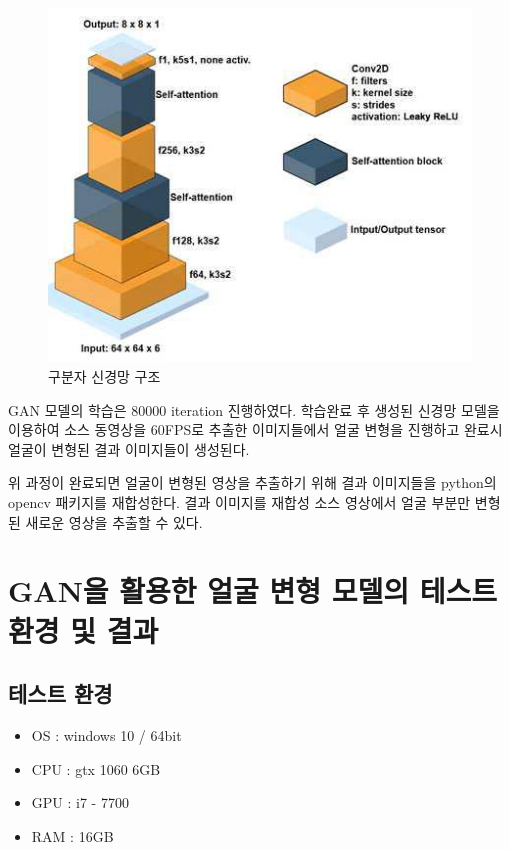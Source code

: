 \documentclass[chapter,oneside]{oblivoir}
\newcommand{\spec}{
    \begin{itemize}
        \item OS : windows 10 / 64bit
        \item CPU : gtx 1060 6GB
        \item GPU : i7 - 7700
        \item RAM : 16GB
    \end{itemize}
    }
\begin{document}
\begin{enumerate}
    \begin{figure}[h!]
    \centering
    \includegraphics{pic/chp5/img906}
    \caption{구분자 신경망 구조\cite{reference11}}
    \end{figure}

    GAN 모델의 학습은 80000 iteration 진행하였다. 학습완료 후 생성된 신경망 모델을 이용하여 소스 동영상을 60FPS로 추출한 이미지들에서 얼굴 변형을 진행하고 완료시 얼굴이 변형된 결과 이미지들이 생성된다.

    위 과정이 완료되면 얼굴이 변형된 영상을 추출하기 위해 결과 이미지들을 python의 opencv 패키지를 재합성한다. 결과 이미지를 재합성 소스 영상에서 얼굴 부분만 변형된 새로운 영상을 추출할 수 있다.
\end{enumerate}

    \section{ GAN을 활용한 얼굴 변형 모델의 테스트 환경 및 결과}

    \subsection{테스트 환경}
    \spec
\end{document}
